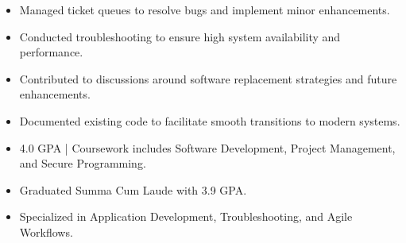 \par\smallskip
\noindent
\begin{minipage}{20cm}
  \begin{minipage}{9.75cm}
    \begin{itemize}
      \item Managed ticket queues to resolve bugs and implement minor enhancements.
      \item Conducted troubleshooting to ensure high system availability and performance.
    \end{itemize}
  \end{minipage}
  \hfill
  \begin{minipage}{9.75cm}
    \begin{itemize}
      \item Contributed to discussions around software replacement strategies and future enhancements.
      \item Documented existing code to facilitate smooth transitions to modern systems.
    \end{itemize}
  \end{minipage}
\end{minipage}
\par\smallskip
\divider

\begin{itemize}
  \item 4.0 GPA | Coursework includes Software Development, Project Management, and Secure Programming.
\end{itemize}
\divider

\begin{itemize}
  \item Graduated Summa Cum Laude with 3.9 GPA.
  \item Specialized in Application Development, Troubleshooting, and Agile Workflows.
\end{itemize}

\noindent
\begin{minipage}{20cm}
\end{minipage}


